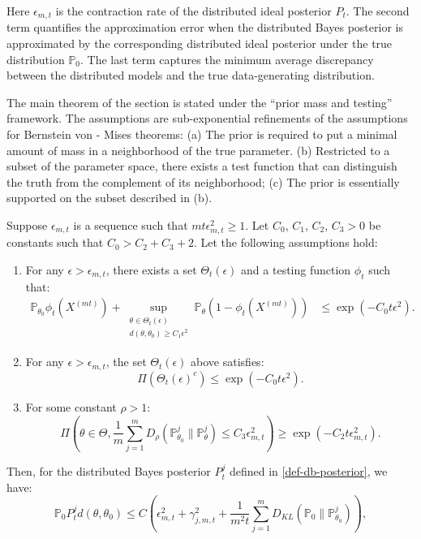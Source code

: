 \documentclass[twoside,11pt]{article}
\numberwithin{equation}{section}
\newcommand\bP{\mathbb{P}}
\begin{document}
{Here $\epsilon_{m,t}$ is the contraction rate of the distributed ideal posterior $P_t$. The second term quantifies the approximation error when the distributed Bayes posterior is approximated by the corresponding distributed ideal posterior under the true distribution $\bP_0$. The last term captures the minimum average discrepancy between the distributed models and the true data-generating distribution.

The main theorem of the section is stated under the “prior mass and testing” framework. The assumptions are sub-exponential refinements of the assumptions for Bernstein von - Mises theorems: (a) The prior is required to put a minimal amount of mass in a neighborhood of the true parameter. (b) Restricted to a subset of the parameter space, there exists a test function that can distinguish the truth from the complement of its neighborhood; (c) The prior is essentially supported on the subset described in (b). 
\begin{theorem} \label{thm:contraction1}
Suppose $\epsilon_{m,t}$ is a sequence such that $mt\epsilon_{m,t}^2 \geq 1$. Let $C_0$, $C_1$, $C_2$, $C_3 > 0$ be constants such that $C_0 > C_2 + C_3 + 2$. Let the following assumptions hold:  
\begin{enumerate}
\item For any $\epsilon > \epsilon_{m,t}$, there exists a set $\Theta_t(\epsilon)$ and a testing function $\phi_t$ such that:
\begin{align}
\bP_{\theta_0} \phi_t(X^{(mt)}) + \sup_{\substack{\theta \in \Theta_t(\epsilon)\\ d(\theta, \theta_0) \geq C_1 \epsilon^2}} \bP_\theta (1 - \phi_t(X^{(mt)})) &\leq \exp\left(-C_0 t \epsilon^2\right). \tag{C1} \label{assumption:C1}
\end{align}

\item For any $\epsilon > \epsilon_{m,t}$, the set $\Theta_t(\epsilon)$ above satisfies:
\begin{equation}
\Pi\left(\Theta_t(\epsilon)^c\right) \leq \exp\left(-C_0 t \epsilon^2\right). \tag{C2} \label{assumption:C2}
\end{equation}

\item For some constant $\rho > 1$:
\begin{equation}
\Pi\left(\theta \in \Theta,  \frac{1}{m} \sum_{j = 1}^m D_\rho(\bP_{\theta_0}^j \parallel \bP_\theta^j) \leq C_3 \epsilon_{m,t}^2 \right) \geq \exp\left(-C_2 t \epsilon_{m,t}^2\right). \tag{C3} \label{assumption:C3}
\end{equation}
\end{enumerate}
 Then, for the distributed Bayes posterior $P_t^j$ defined in \eqref{def-db-posterior}, we have:
\begin{equation}\label{eqn:contraction11}
    \bP_0 P_t^j d(\theta, \theta_0) \leq C \left(\epsilon_{m,t}^2 + \gamma_{j,m,t}^2+ \frac{1}{m^2 t} \sum_{j = 1}^m D_{KL}(\bP_0 \parallel \bP_{\theta_0}^j) \right), 
\end{equation}


\end{theorem}}
\end{document}
